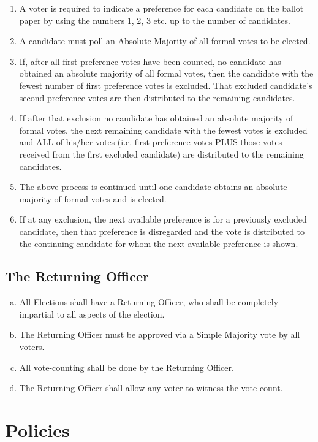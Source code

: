 \documentclass[a4paper,12pt]{article}
\begin{document}
\begin{enumerate}
	\item A voter is required to indicate a preference for each candidate on the ballot paper by using the numbers 1, 2, 3 etc. up to the number of candidates.
	\item A candidate must poll an Absolute Majority of all formal votes to be elected.
	\item If, after all first preference votes have been counted, no candidate has obtained an absolute majority of all formal votes, then the candidate with the fewest number of first preference votes is excluded. That excluded candidate's second preference votes are then distributed to the remaining candidates.
	\item If after that exclusion no candidate has obtained an absolute majority of formal votes, the next remaining candidate with the fewest votes is excluded and ALL of his/her votes (i.e. first preference votes PLUS those votes received from the first excluded candidate) are distributed to the remaining candidates.
	\item The above process is continued until one candidate obtains an absolute majority of formal votes and is elected.
	\item If at any exclusion, the next available preference is for a previously excluded candidate, then that preference is disregarded and the vote is distributed to the continuing candidate for whom the next available preference is shown.
\end{enumerate}

\subsection{The Returning Officer}

\begin{enumerate}[a)]
	\item All Elections shall have a Returning Officer, who shall be completely impartial to all aspects of the election.
	\item The Returning Officer must be approved via a Simple Majority vote by all voters.
	\item All vote-counting shall be done by the Returning Officer.
	\item The Returning Officer shall allow any voter to witness the vote count.
\end{enumerate}

\section{Policies}
\end{document}
